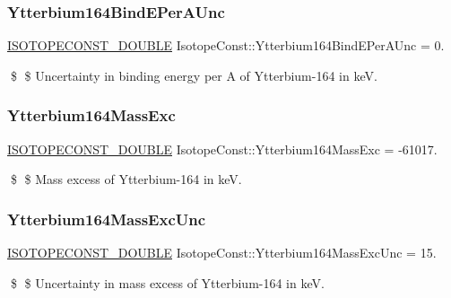 \subsubsection{\texorpdfstring{Ytterbium164\+Bind\+E\+Per\+A\+Unc}{Ytterbium164BindEPerAUnc}}
{\footnotesize\ttfamily \mbox{\hyperlink{group___isotope_const-_macros_ga8f45a7272ce02c0b4c65c44636ed719a}{I\+S\+O\+T\+O\+P\+E\+C\+O\+N\+S\+T\+\_\+\+D\+O\+U\+B\+LE}} Isotope\+Const\+::\+Ytterbium164\+Bind\+E\+Per\+A\+Unc = 0.}

\$ \$ Uncertainty in binding energy per A of Ytterbium-\/164 in keV. \mbox{\label{group___isotope_const-_ytterbium-_yb164_gaf150b84019e022a0ee9f5a9209da4741}} 
\subsubsection{\texorpdfstring{Ytterbium164\+Mass\+Exc}{Ytterbium164MassExc}}
{\footnotesize\ttfamily \mbox{\hyperlink{group___isotope_const-_macros_ga8f45a7272ce02c0b4c65c44636ed719a}{I\+S\+O\+T\+O\+P\+E\+C\+O\+N\+S\+T\+\_\+\+D\+O\+U\+B\+LE}} Isotope\+Const\+::\+Ytterbium164\+Mass\+Exc = -\/61017.}

\$ \$ Mass excess of Ytterbium-\/164 in keV. \mbox{\label{group___isotope_const-_ytterbium-_yb164_ga009aaa94a39851b186cbf7c27d873c53}} 
\subsubsection{\texorpdfstring{Ytterbium164\+Mass\+Exc\+Unc}{Ytterbium164MassExcUnc}}
{\footnotesize\ttfamily \mbox{\hyperlink{group___isotope_const-_macros_ga8f45a7272ce02c0b4c65c44636ed719a}{I\+S\+O\+T\+O\+P\+E\+C\+O\+N\+S\+T\+\_\+\+D\+O\+U\+B\+LE}} Isotope\+Const\+::\+Ytterbium164\+Mass\+Exc\+Unc = 15.}

\$ \$ Uncertainty in mass excess of Ytterbium-\/164 in keV. \mbox{\label{group___isotope_const-_ytterbium-_yb164_ga5ae421c9784bcf0eb3455001b6afebdb}} 
